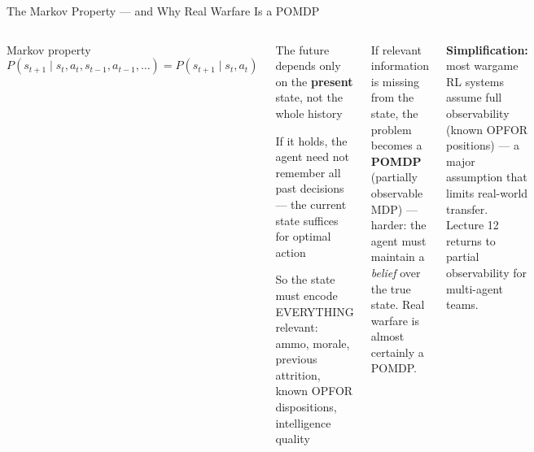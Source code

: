 \documentclass[aspectratio=169,10pt,t]{beamer}
\begin{document}
\begin{frame}{The Markov Property --- and Why Real Warfare Is a POMDP}
\begin{columns}[T]
\begin{fbx}{Markov property}\[P(s_{t+1}\mid s_t,a_t,s_{t-1},a_{t-1},\ldots)=P(s_{t+1}\mid s_t,a_t)\]\end{fbx}
\begin{tl}\item The future depends only on the \textbf{present} state, not the whole history\item If it holds, the agent need not remember all past decisions --- the current state suffices for optimal action\item So the state must encode EVERYTHING relevant: ammo, morale, previous attrition, known OPFOR dispositions, intelligence quality\end{tl}
\begin{wbox}\scriptsize If relevant information is missing from the state, the problem becomes a \textbf{POMDP} (partially observable MDP) --- harder: the agent must maintain a \emph{belief} over the true state. Real warfare is almost certainly a POMDP.\end{wbox}
\begin{ibox}\scriptsize\textbf{Simplification:} most wargame RL systems assume full observability (known OPFOR positions) --- a major assumption that limits real-world transfer. Lecture 12 returns to partial observability for multi-agent teams.\end{ibox}
\end{columns}
\end{frame}
\end{document}
